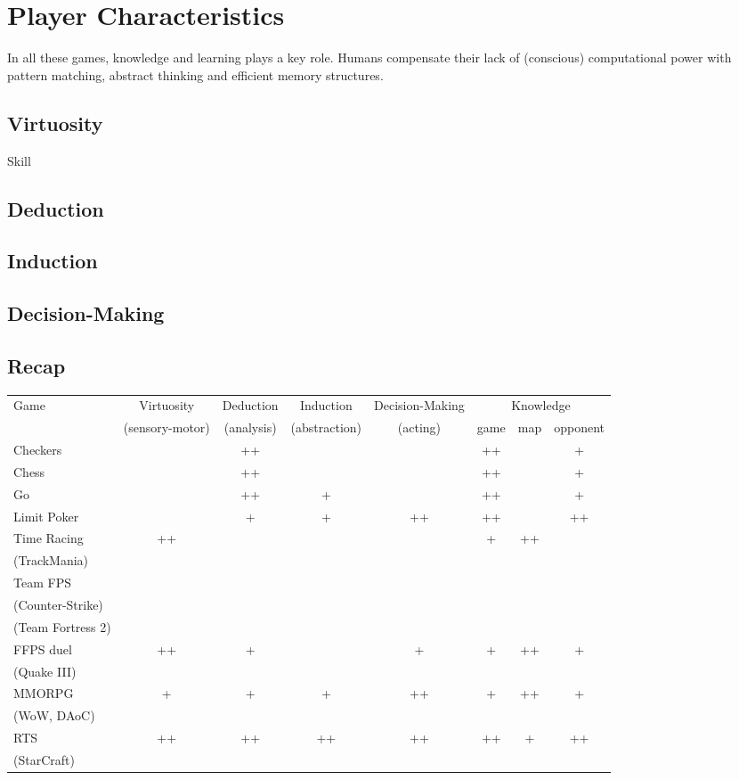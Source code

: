 \section{Player Characteristics}
In all these games, knowledge and learning plays a key role. Humans compensate their lack of (conscious) computational power with pattern matching, abstract thinking and efficient memory structures. 
\subsection{Virtuosity}
Skill
\subsection{Deduction}
\subsection{Induction}
\subsection{Decision-Making}
\subsection{Recap}
\begin{sidewaystable}
\begin{tabular}{|l|ccccccc|}
\hline 
Game & Virtuosity & Deduction & Induction & Decision-Making & \multicolumn{3}{c|}{Knowledge} \\
     & (sensory-motor) & (analysis) & (abstraction) & (acting) & game & map & opponent \\
Checkers &   & ++ & &   & ++& &+ \\
Chess &   & ++ & &   & ++& &+ \\
Go &   & ++ & + &   & ++& &+ \\
Limit Poker &   & + & + & ++ & ++& &++ \\
Time Racing & ++ &   &   &   & +&++&  \\
(TrackMania) & & & & & & & \\
Team FPS & & & & & & & \\ 
(Counter-Strike) & & & & & & & \\ 
(Team Fortress 2) & & & & & & & \\ 
FFPS duel & ++ & + &   & + & +&++&+ \\
(Quake III) & & & & & & & \\ 
MMORPG & + & + & + & ++ & +&++&+ \\
(WoW, DAoC) & & & & & & & \\ 
RTS & ++ & ++ & ++ & ++ & ++&+&++ \\
(StarCraft) & & & & & & & \\
\hline
\end{tabular}
\end{sidewaystable}

